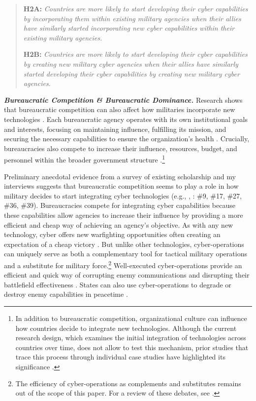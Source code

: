 \documentclass[12pt, letterpaper]{article}
\renewcommand{\baselinestretch}{1.35}
\let\oldfootnote\footnote
\renewcommand\footnote[1]{\oldfootnote{%
		\renewcommand\baselinestretch{.8}%
		\large\footnotesize\ignorespaces#1}} \addtolength{\footnotesep}{3pt}
\theoremstyle{plain}
\theoremstyle{remark}
\begin{document}
\begin{quote}
	\textbf{H2A:} 
	\textit{Countries are more likely to start developing their cyber capabilities by incorporating them within existing military agencies when their allies have similarly started incorporating new cyber capabilities within their existing military agencies.}
	\vspace{2mm}
	
	\textbf{H2B:} 
	\textit{Countries are more likely to start developing their cyber capabilities by creating new military cyber agencies when their allies have similarly started developing their cyber capabilities by creating new military cyber agencies.}
\end{quote}

\vspace{3mm}

\noindent
\textit{\textbf{Bureaucratic Competition \& Bureaucratic Dominance.}} 
Research shows that bureaucratic competition can also affect how militaries incorporate new technologies \citep{Allison1975armaments, Brown2019, Neufeld2005end, Grauer2015WP}. Each bureaucratic agency operates with its own institutional goals and interests, focusing on maintaining influence, fulfilling its mission, and securing the necessary capabilities to ensure the organization's health \citep{Allison1969}. Crucially, bureaucracies also compete to increase their influence, resources, budget, and personnel within the broader government structure \citep{lai2014domestic}.\footnote{ In addition to bureaucratic competition, organizational culture can influence how countries decide to integrate new technologies. Although the current research design, which examines the initial integration of technologies across countries over time, does not allow to test this mechanism, prior studies that trace this process through individual case studies have highlighted its significance \citep{White2019, Kostyuk2022sources}.
    } 

Preliminary anecdotal evidence from a survey of existing scholarship and my interviews suggests that bureaucratic competition seems to play a role in how military decides to start integrating cyber technologies (e.g., \citealt{Tabansky2020}, \citealp{interviews2019}: \#9, \#17, \#27, \#36, \#39). Bureaucracies compete for integrating cyber capabilities because these capabilities allow agencies to increase their influence by providing a more efficient and cheap way of achieving an agency's objective. 
As with any new technology, cyber offers new warfighting opportunities often creating an expectation of a cheap victory \citep{Rovner2023}. But unlike other technologies, cyber-operations can uniquely serve as both a complementary tool for tactical military operations and a substitute for military force.\footnote{
	The efficiency of cyber-operations as complements and substitutes remains out of the scope of this paper. For a review of these debates, see \citealt{KostyukGartzke2022}.
	} 
Well-executed cyber-operations provide an efficient and quick way of corrupting enemy communications and disrupting their battlefield effectiveness \citep{liff2012cyberwar}. States can also use cyber-operations to degrade or destroy enemy capabilities in peacetime \citep{valeriano2018cyber}.
\end{document}
